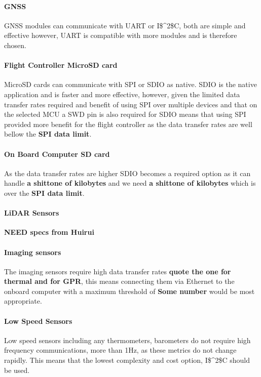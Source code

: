 \paragraph{\gls{GNSS}}
\gls{GNSS} modules can communicate with \gls{UART} or \gls{I$^2$C}, both are simple and effective however, \gls{UART} is compatible with more modules and is therefore chosen.

\paragraph{Flight Controller MicroSD card}
MicroSD cards can communicate with \gls{SPI} or \gls{SDIO} as native. \gls{SDIO} is the native application and is faster and more effective, however, given the limited data transfer rates required and benefit of using \gls{SPI} over multiple devices and that on the selected \gls{MCU} a \gls{SWD} pin is also required for \gls{SDIO} means that using \gls{SPI} provided more benefit for the flight controller as the data transfer rates are well bellow the \textbf{SPI data limit}.

\paragraph{On Board Computer SD card}
As the data transfer rates are higher \gls{SDIO} becomes a required option as it can handle \textbf{a shittone of kilobytes} and we need \textbf{a shittone of kilobytes} which is over the \textbf{SPI data limit}.

\paragraph{\gls{LiDAR} Sensors}
\textbf{NEED specs from Huirui}

\paragraph{Imaging sensors}
The imaging sensors require high data transfer rates \textbf{quote the one for thermal and for GPR}, this means connecting them via Ethernet to the onboard computer with a maximum threshold of \textbf{Some number} would be most appropriate.

\paragraph{Low Speed Sensors}
Low speed sensors including any thermometers, barometers do not require high frequency 
communications, more than 1Hz, as these metrics do not change rapidly. This means that the lowest complexity and cost option, \gls{I$^2$C} should be used.


